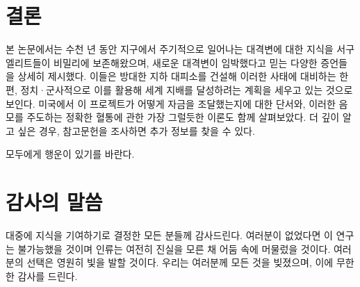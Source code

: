 \documentclass[10pt,twocolumn,letterpaper]{article}
\begin{document}
\section{결론}

본 논문에서는 수천 년 동안 지구에서 주기적으로 일어나는 대격변에 대한 지식을 서구 엘리트들이 비밀리에 보존해왔으며, 새로운 대격변이 임박했다고 믿는 다양한 증언들을 상세히 제시했다. 이들은 방대한 지하 대피소를 건설해 이러한 사태에 대비하는 한편, 정치·군사적으로 이를 활용해 세계 지배를 달성하려는 계획을 세우고 있는 것으로 보인다. 미국에서 이 프로젝트가 어떻게 자금을 조달했는지에 대한 단서와, 이러한 음모를 주도하는 정확한 혈통에 관한 가장 그럴듯한 이론도 함께 살펴보았다. 더 깊이 알고 싶은 경우, 참고문헌을 조사하면 추가 정보를 찾을 수 있다.

모두에게 행운이 있기를 바란다. 

\section{감사의 말씀}

대중에 지식을 기여하기로 결정한 모든 분들께 감사드린다. 여러분이 없었다면 이 연구는 불가능했을 것이며 인류는 여전히 진실을 모른 채 어둠 속에 머물렀을 것이다. 여러분의 선택은 영원히 빛을 발할 것이다. 우리는 여러분께 모든 것을 빚졌으며, 이에 무한한 감사를 드린다.

\clearpage
\twocolumn

{\small
\renewcommand{\refname}{참고문헌}


}
\end{document}
